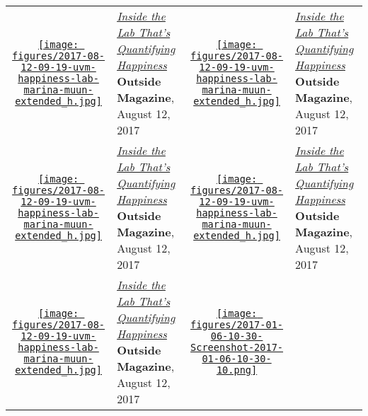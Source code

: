 \begin{longtable}{c p{7.5cm} c p{7.5cm} }
\rule{0pt}{5ex} 
\parbox[c]{1.1cm}{ \href{https://www.outsideonline.com/2230891/inside-lab-thats-quantifying-happiness}{\texttt{[image: figures/2017-08-12-09-19-uvm-happiness-lab-marina-muun-extended\_h.jpg]}} }
& \parbox[c]{7.5cm}{ {\small \textcolor{blue}{\textit{\href{https://www.outsideonline.com/2230891/inside-lab-thats-quantifying-happiness} {Inside the Lab That's Quantifying Happiness} } } }\\ \textbf{Outside Magazine}, August 12, 2017 }  &  
\parbox[c]{1.1cm}{ \href{https://www.outsideonline.com/2230891/inside-lab-thats-quantifying-happiness}{\texttt{[image: figures/2017-08-12-09-19-uvm-happiness-lab-marina-muun-extended\_h.jpg]}} }
& \parbox[c]{7.5cm}{ {\small \textcolor{blue}{\textit{\href{https://www.outsideonline.com/2230891/inside-lab-thats-quantifying-happiness} {Inside the Lab That's Quantifying Happiness} } } }\\ \textbf{Outside Magazine}, August 12, 2017 }  \\
\rule{0pt}{5ex} 
\parbox[c]{1.1cm}{ \href{https://www.outsideonline.com/2230891/inside-lab-thats-quantifying-happiness}{\texttt{[image: figures/2017-08-12-09-19-uvm-happiness-lab-marina-muun-extended\_h.jpg]}} }
& \parbox[c]{7.5cm}{ {\small \textcolor{blue}{\textit{\href{https://www.outsideonline.com/2230891/inside-lab-thats-quantifying-happiness} {Inside the Lab That's Quantifying Happiness} } } }\\ \textbf{Outside Magazine}, August 12, 2017 }  &  
\parbox[c]{1.1cm}{ \href{https://www.outsideonline.com/2230891/inside-lab-thats-quantifying-happiness}{\texttt{[image: figures/2017-08-12-09-19-uvm-happiness-lab-marina-muun-extended\_h.jpg]}} }
& \parbox[c]{7.5cm}{ {\small \textcolor{blue}{\textit{\href{https://www.outsideonline.com/2230891/inside-lab-thats-quantifying-happiness} {Inside the Lab That's Quantifying Happiness} } } }\\ \textbf{Outside Magazine}, August 12, 2017 }  \\
\rule{0pt}{5ex} 
\parbox[c]{1.1cm}{ \href{https://www.outsideonline.com/2230891/inside-lab-thats-quantifying-happiness}{\texttt{[image: figures/2017-08-12-09-19-uvm-happiness-lab-marina-muun-extended\_h.jpg]}} }
& \parbox[c]{7.5cm}{ {\small \textcolor{blue}{\textit{\href{https://www.outsideonline.com/2230891/inside-lab-thats-quantifying-happiness} {Inside the Lab That's Quantifying Happiness} } } }\\ \textbf{Outside Magazine}, August 12, 2017 }  &  
\parbox[c]{1.1cm}{ \href{http://nymag.com/scienceofus/2016/11/stories-have-six-emotional-shapes.html}{\texttt{[image: figures/2017-01-06-10-30-Screenshot-2017-01-06-10-30-10.png]}} }

\end{longtable}
